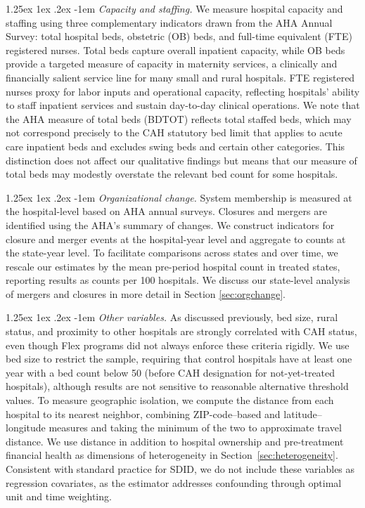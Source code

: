 \documentclass[a4paper, 12pt, twoside]{article}
\makeatletter
\renewcommand\paragraph{\@startsection{paragraph}{4}{\z@}%
   {1.25ex \@plus 1ex \@minus .2ex}%
   {-1em}%
   {\normalfont\itshape}}
\makeatother
\begin{document}
\paragraph{\textit{Capacity and staffing.}}
We measure hospital capacity and staffing using three complementary indicators drawn from the AHA Annual Survey: total hospital beds, obstetric (OB) beds, and full-time equivalent (FTE) registered nurses. Total beds capture overall inpatient capacity, while OB beds provide a targeted measure of capacity in maternity services, a clinically and financially salient service line for many small and rural hospitals. FTE registered nurses proxy for labor inputs and operational capacity, reflecting hospitals' ability to staff inpatient services and sustain day-to-day clinical operations. We note that the AHA measure of total beds (BDTOT) reflects total staffed beds, which may not correspond precisely to the CAH statutory bed limit that applies to acute care inpatient beds and excludes swing beds and certain other categories. This distinction does not affect our qualitative findings but means that our measure of total beds may modestly overstate the relevant bed count for some hospitals.

\paragraph{\textit{Organizational change.}}  
System membership is measured at the hospital-level based on AHA annual surveys. Closures and mergers are identified using the AHA’s summary of changes. We construct indicators for closure and merger events at the hospital-year level and aggregate to counts at the state-year level. To facilitate comparisons across states and over time, we rescale our estimates by the mean pre-period hospital count in treated states, reporting results as counts per 100 hospitals. We discuss our state-level analysis of mergers and closures in more detail in Section \ref{sec:orgchange}. 

\paragraph{\textit{Other variables.}}  
As discussed previously, bed size, rural status, and proximity to other hospitals are strongly correlated with CAH status, even though Flex programs did not always enforce these criteria rigidly. We use bed size to restrict the sample, requiring that control hospitals have at least one year with a bed count below 50 (before CAH designation for not-yet-treated hospitals), although results are not sensitive to reasonable alternative threshold values. To measure geographic isolation, we compute the distance from each hospital to its nearest neighbor, combining ZIP-code--based and latitude--longitude measures and taking the minimum of the two to approximate travel distance. We use distance in addition to hospital ownership and pre-treatment financial health as dimensions of heterogeneity in Section~\ref{sec:heterogeneity}. Consistent with standard practice for SDID, we do not include these variables as regression covariates, as the estimator addresses confounding through optimal unit and time weighting.
\end{document}
